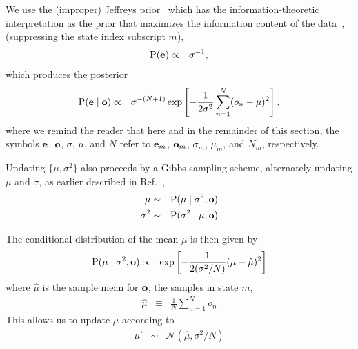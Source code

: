 \documentclass[aps,pre,twocolumn,superscriptaddress,nofootinbib,longbibliography]{revtex4-1}
\newcommand{\bfm}[1]{{\bf #1}}
\renewcommand{\Pr}{\mathrm{P}}
\begin{document}
{We use the (improper) Jeffreys prior~\cite{jeffreys:proc-royal-soc-a:1946:jeffreys-prior} which has the information-theoretic interpretation as the prior that maximizes the information content of the data~\cite{goyal:bayesian-inference-book:2005:jeffreys-prior}, (suppressing the state index subscript $m$),
\begin{eqnarray}
\Pr(\bfm{e}) &\propto& \sigma^{-1} \label{equation:emission-parameter-prior} ,
\end{eqnarray}
which produces the posterior
\begin{eqnarray}
\Pr(\bfm{e} \mid \bfm{o}) &\propto& \sigma^{-(N+1)} \exp\left[-\frac{1}{2 \sigma^2} \sum_{n=1}^N (o_n - \mu)^2 \right] ,
\end{eqnarray}
where we remind the reader that here and in the remainder of this section, the symbols $\bfm{e}$, $\bfm{o}$, $\sigma$, $\mu$, and $N$ refer to $\bfm{e}_m$, $\bfm{o}_m$, $\sigma_m$, $\mu_m$, and $N_m$, respectively.

Updating $\{\mu, \sigma^2\}$ also proceeds by a Gibbs sampling scheme, alternately updating $\mu$ and $\sigma$, as earlier described in Ref.~\citep{chodera-noe:jcp:2011:observable-sampling},
\begin{eqnarray}
\mu &\sim& \Pr(\mu \mid \sigma^2, \bfm{o}) \nonumber \\
\sigma^2 &\sim& \Pr(\sigma^2 \mid \mu, \bfm{o})
\end{eqnarray}

The conditional distribution of the mean $\mu$ is then given by
\begin{eqnarray}
\Pr(\mu \mid \sigma^2, \bfm{o}) &\propto& \exp\left[-\frac{1}{2 (\sigma^2/N)} (\mu - \hat{\mu})^2 \right] 
\end{eqnarray}
where $\hat{\mu}$ is the sample mean for $\bfm{o}$, the samples in state $m$,
\begin{eqnarray}
\hat{\mu} &\equiv& \frac{1}{N} \sum_{n=1}^N o_n
\end{eqnarray}
This allows us to update $\mu$ according to 
\begin{eqnarray}
\mu' &\sim& \mathcal{N}(\hat{\mu}, \sigma^2 / N)
\end{eqnarray}

}
\end{document}
